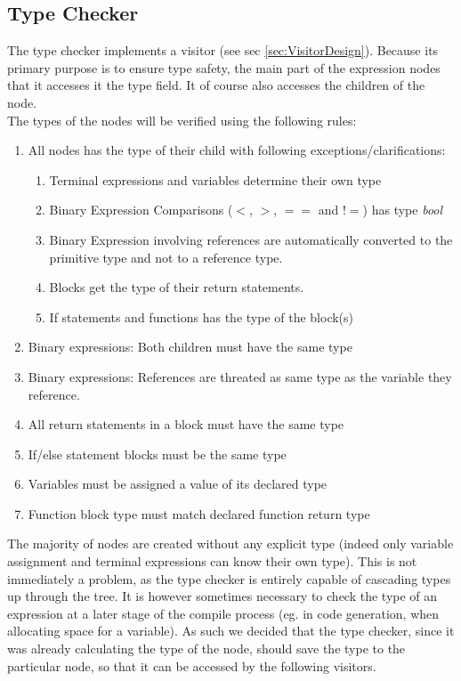 \subsection{Type Checker}
\label{sec:typeCheckerDesign}
The type checker implements a visitor (see sec \ref{sec:VisitorDesign}). 
Because its primary purpose is to ensure type safety, the main part of the expression nodes that it accesses it the type field. It of course also accesses the children of the node.\\

The types of the nodes will be verified using the following rules:
\begin{enumerate}

\item All nodes has the type of their child with following exceptions/clarifications:
\begin{enumerate}
\item Terminal expressions and variables determine their own type
\item Binary Expression Comparisons ($<$, $>$, $==$ and $!=$) has type \textit{bool}
\item Binary Expression involving references are automatically converted to the primitive type and not to a reference type.
\item Blocks get the type of their return statements. 
\item If statements and functions has the type of the block(s)
\end{enumerate}
\item Binary expressions: Both children must have the same type
\item Binary expressions: References are threated as same type as the
  variable they reference.
\item All return statements in a block must have the same type
\item If/else statement blocks must be the same type
\item Variables must be assigned a value of its declared type
\item Function block type must match declared function return type
\end{enumerate}

The majority of nodes are created without any explicit type (indeed only variable
assignment and terminal expressions can know their own type). This is not immediately
a problem, as the type checker is entirely capable of cascading types up through the
tree. It is however sometimes necessary to check the type of an expression at a later
stage of the compile process (eg. in code generation, when allocating space for a variable). As such we decided that the type checker, since it was already calculating the type of the node, should save the type to the particular node, so that it can be accessed by the following visitors.
